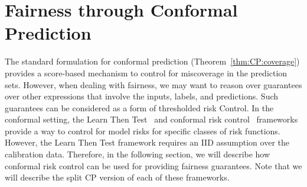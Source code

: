 \section{Fairness through Conformal Prediction}
The standard formulation for conformal prediction (Theorem~\ref{thm:CP:coverage}) provides a score-based mechanism to control for miscoverage in the prediction sets.
However, when dealing with fairness, we may want to reason over guarantees over other expressions that involve the inputs, labels, and predictions.
Such guarantees can be considered as a form of thresholded risk Control.
In the conformal setting, the Learn Then Test~\citep{angelopoulos2021learn} and conformal risk control~\citep{angelopoulos2024conformal} frameworks provide a way to control for model risks for specific classes of risk functions.
However, the Learn Then Test framework requires an IID assumption over the calibration data.
Therefore, in the following section, we will describe how conformal risk control can be used for providing fairness guarantees.
Note that we will describe the split CP version of each of these frameworks.
